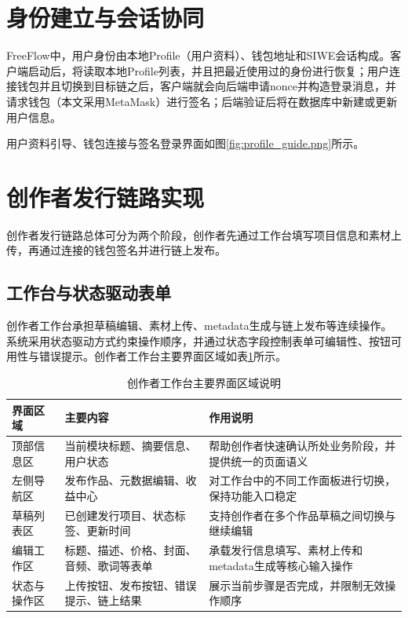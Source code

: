 \section{身份建立与会话协同}

FreeFlow中，用户身份由本地Profile（用户资料）、钱包地址和SIWE会话构成。客户端启动后，将读取本地Profile列表，并且把最近使用过的身份进行恢复；用户连接钱包并且切换到目标链之后，客户端就会向后端申请nonce并构造登录消息，并请求钱包（本文采用MetaMask）进行签名；后端验证后将在数据库中新建或更新用户信息。


用户资料引导、钱包连接与签名登录界面如图\ref{fig:profile_guide.png}所示。


\section{创作者发行链路实现}

创作者发行链路总体可分为两个阶段，创作者先通过工作台填写项目信息和素材上传，再通过连接的钱包签名并进行链上发布。

\subsection{工作台与状态驱动表单}

创作者工作台承担草稿编辑、素材上传、metadata生成与链上发布等连续操作。系统采用状态驱动方式约束操作顺序，并通过状态字段控制表单可编辑性、按钮可用性与错误提示。创作者工作台主要界面区域如表\ref{tab:creator_workshop_regions}所示。

\begin{table}[htbp]
    \linespread{1.45}
    \songti
    \centering
    \caption{创作者工作台主要界面区域说明}\label{tab:creator_workshop_regions}
    \begin{tabular}{|l|p{4.0cm}|p{6.1cm}|}
        \hline
        界面区域   & 主要内容                 & 作用说明                            \\ \hline
        顶部信息区  & 当前模块标题、摘要信息、用户状态     & 帮助创作者快速确认所处业务阶段，并提供统一的页面语义      \\ \hline
        左侧导航区  & 发布作品、元数据编辑、收益中心      & 对工作台中的不同工作面板进行切换，保持功能入口稳定       \\ \hline
        草稿列表区  & 已创建发行项目、状态标签、更新时间    & 支持创作者在多个作品草稿之间切换与继续编辑           \\ \hline
        编辑工作区  & 标题、描述、价格、封面、音频、歌词等表单 & 承载发行信息填写、素材上传和metadata生成等核心输入操作 \\ \hline
        状态与操作区 & 上传按钮、发布按钮、错误提示、链上结果  & 展示当前步骤是否完成，并限制无效操作顺序            \\ \hline
    \end{tabular}
\end{table}

